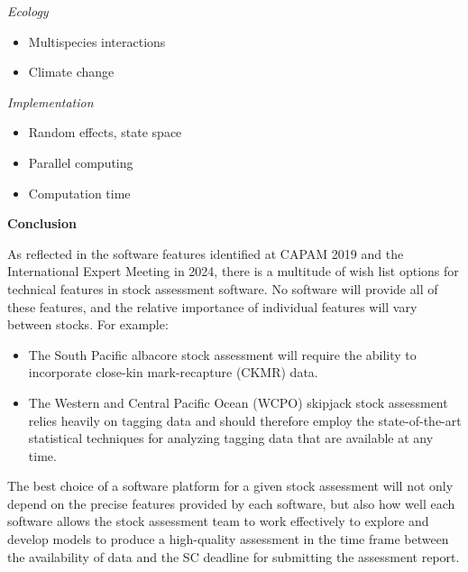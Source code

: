 \documentclass{SCreport}
\begin{document}
\vspace{1ex}

\textit{Ecology}

\begin{itemize}
  \item Multispecies interactions\\[-4.5ex]
  \item Climate change
\end{itemize}

\vspace{1ex}

\textit{Implementation}

\begin{itemize}
  \item Random effects, state space\\[-4.5ex]
  \item Parallel computing\\[-4.5ex]
  \item Computation time
\end{itemize}

\vspace{3ex}

\textbf{Conclusion}

As reflected in the software features identified at CAPAM 2019 and the
International Expert Meeting in 2024, there is a multitude of wish list options
for technical features in stock assessment software. No software will provide
all of these features, and the relative importance of individual features will
vary between stocks. For example:

\begin{itemize}
  \item The South Pacific albacore stock assessment will require the ability to
  incorporate close-kin mark-recapture (CKMR) data.
  \item The Western and Central Pacific Ocean (WCPO) skipjack stock assessment
  relies heavily on tagging data and should therefore employ the
  state-of-the-art statistical techniques for analyzing tagging data that are
  available at any time.
\end{itemize}

The best choice of a software platform for a given stock assessment will not
only depend on the precise features provided by each software, but also how well
each software allows the stock assessment team to work effectively to explore
and develop models to produce a high-quality assessment in the time frame
between the availability of data and the SC deadline for submitting the
assessment report.
\end{document}
